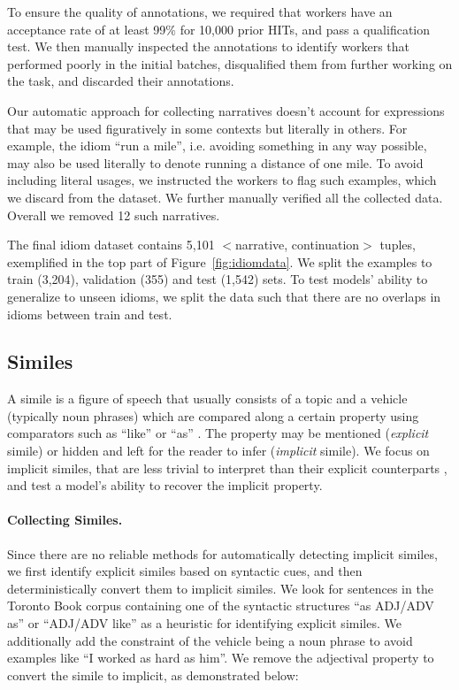 To ensure the quality of annotations, we required that workers have an acceptance rate of at least 99\% for 10,000 prior HITs, and pass a qualification test. We then manually inspected the annotations to identify workers that performed poorly in the initial batches, disqualified them from further working on the task, and discarded their annotations. 


Our automatic approach for collecting narratives doesn't account for expressions that may be used figuratively in some contexts but literally in others. For example, the idiom ``run a mile'', i.e. avoiding something in any way possible, may also be used literally to denote running a distance of one mile. To avoid including literal usages, we instructed the workers to flag such examples, which we discard from the dataset. We further manually verified all the collected data. Overall we removed 12 such narratives. 

The final idiom dataset contains 5,101 $\lt$narrative, continuation$\gt$ tuples, exemplified in the top part of Figure~\ref{fig:idiomdata}. We split the examples to train (3,204), validation (355) and test (1,542) sets. To test models' ability to generalize to unseen idioms, we split the data such that there are no overlaps in idioms between train and test.

\subsection{Similes}
\label{sec:datasimile}

A simile is a figure of speech that usually consists of a topic and a vehicle (typically noun phrases) which are compared along a certain property using comparators such as ``like'' or ``as'' \cite{hanks2013lexical,niculae-danescu-niculescu-mizil-2014-brighter}. The property may be mentioned (\emph{explicit} simile) or hidden and left for the reader to infer (\textit{implicit} simile). We focus on implicit similes, that are less trivial to interpret than their explicit counterparts \cite{qadir-etal-2016-automatically}, and test a model's ability to recover the implicit property.

\paragraph{Collecting Similes.} Since there are no reliable methods for automatically detecting implicit similes, we first identify explicit similes based on syntactic cues, and then deterministically convert them to implicit similes. We look for sentences in the Toronto Book corpus containing one of the syntactic structures ``as ADJ/ADV as'' or ``ADJ/ADV like'' as a heuristic for identifying explicit similes. We additionally add the constraint of the vehicle being a noun phrase to avoid examples like ``I worked as hard as him''. We remove the adjectival property to convert the simile to implicit, as demonstrated below:

